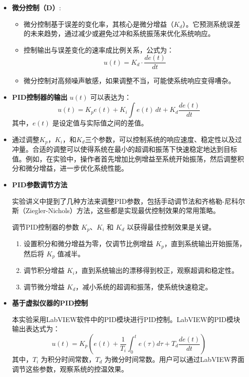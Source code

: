 \documentclass[dvipsnames, svgnames,a4paper,11pt]{article}
\begin{document}
\begin{enumerate}
\begin{itemize}
			\item \textbf{微分控制（D）}:
			\begin{itemize}
				\item 微分控制基于误差的变化率，其核心是微分增益（\( K_d \)）。它预测系统误差的未来趋势，通过减少或避免过冲和系统振荡来优化系统响应。
				\item 控制输出与误差变化的速率成比例关系，公式为：
				\[
				u(t) = K_d \cdot \frac{d e(t)}{dt}
				\]
				\item 微分控制对高频噪声敏感，如果调整不当，可能使系统响应变得嘈杂。
			\end{itemize}
			
			\item \textbf{PID控制器的输出} \( u(t) \) 可以表达为：
			\[
			u(t) = K_p e(t) + K_i \int e(t) \, dt + K_d \frac{de(t)}{dt}
			\]
			其中，\( e(t) \) 是设定值与实际值之间的差值。
			
			\item 通过调整\( K_p \)，\( K_i \)，和\( K_d \)三个参数，可以控制系统的响应速度、稳定性以及过冲量。合适的调整可以使得系统在最小的超调和振荡下快速稳定地达到目标值。例如，在实验中，操作者首先增加比例增益至系统开始振荡，然后调整积分和微分增益，进一步优化系统性能。
			
			\item \textbf{PID参数调节方法} 
			
			实验讲义中提到了几种方法来调整PID参数，包括手动调节法和齐格勒-尼科尔斯（Ziegler-Nichols）方法，这些都是实现最优控制效果的常用策略。
			
			调节PID控制器的参数 \( K_p \)、\( K_i \) 和 \( K_d \) 以获得最佳控制效果是关键。
			\begin{enumerate}
				\item 设置积分和微分增益为零，仅调节比例增益 \( K_p \)，直到系统输出开始振荡，然后将 \( K_p \) 值减半。
				\item 调节积分增益 \( K_i \)，直到系统输出的漂移得到校正，观察超调和稳定性。
				\item 调节微分增益 \( K_d \)，减小系统的超调和振荡，使系统快速稳定。
			\end{enumerate}
			
			\item \textbf{基于虚拟仪器的PID控制}
			
			本实验采用LabVIEW软件中的PID模块进行PID控制。LabVIEW的PID模块输出表达式为：
			\[
			u(t) = K_p \left( e(t) + \frac{1}{T_i} \int_{0}^{t} e(\tau) d\tau + T_d \frac{d e(t)}{dt} \right)
			\]
			其中，\( T_i \) 为积分时间常数，\( T_d \) 为微分时间常数。用户可以通过LabVIEW界面调节这些参数，观察系统的控温效果。
			

\end{itemize}
\end{enumerate}
\end{document}
